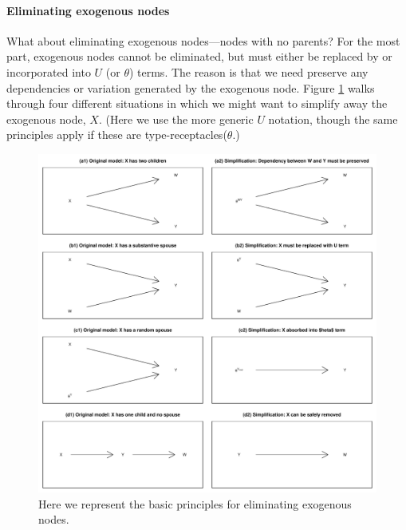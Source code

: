 \documentclass[12pt,]{book}
\let\oldparagraph\paragraph
\renewcommand{\paragraph}[1]{\oldparagraph{#1}\mbox{}}
\begin{document}
\hypertarget{eliminating-exogenous-nodes}{%
\paragraph{Eliminating exogenous nodes}\label{eliminating-exogenous-nodes}}

What about eliminating exogenous nodes---nodes with no parents? For the most part, exogenous nodes cannot be eliminated, but must either be replaced by or incorporated into \(U\) (or \(\theta\)) terms. The reason is that we need preserve any dependencies or variation generated by the exogenous node. Figure \ref{fig:elimrules} walks through four different situations in which we might want to simplify away the exogenous node, \(X\). (Here we use the more generic \(U\) notation, though the same principles apply if these are type-receptacles(\(\theta\).)

\begin{figure}

{\centering \includegraphics[width=.5\textwidth]{ii_files/figure-latex/elimrules-1} 

}

\caption{Here we represent the basic principles for eliminating exogenous nodes.}\label{fig:elimrules}
\end{figure}
\end{document}
